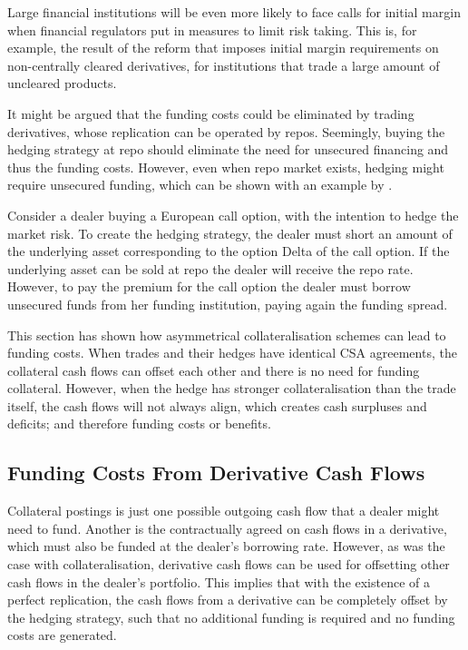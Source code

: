 \documentclass[main.tex]{subfiles}
\begin{document}
        Large financial institutions will be even more likely to face calls for initial margin
        when financial regulators put in measures to limit risk taking.
        This is, for example, the result of the reform \textcite{BCBC2020}
        that imposes initial margin requirements on non-centrally cleared derivatives, 
        for institutions that trade a large amount of uncleared products.

        It might be argued that the funding costs could be eliminated by trading derivatives,
        whose replication can be operated by repos. 
        Seemingly, buying the hedging strategy at repo should eliminate the need for unsecured financing
        and thus the funding costs. 
        However, even when repo market exists, hedging might require unsecured funding,
        which can be shown with an example by \textcite{Castagna2012FVA}.

        \begin{example}
        Consider a dealer buying a European call option, with the intention to hedge the market risk.
        To create the hedging strategy, the dealer must short an amount of the underlying asset corresponding to the option Delta of the call option.
        If the underlying asset can be sold at repo the dealer will receive the repo rate.
        However, to pay the premium for the call option the dealer must borrow unsecured funds from her funding institution,
        paying again the funding spread. 
        \end{example}

        This section has shown how asymmetrical collateralisation schemes
        can lead to funding costs. 
        When trades and their hedges have identical CSA agreements, 
        the collateral cash flows can offset each other and there is no need for funding collateral.
        However, when the hedge has stronger collateralisation than the trade itself,
        the cash flows will not always align, which creates cash surpluses and deficits;
        and therefore funding costs or benefits.
        
    \subsection{Funding Costs From Derivative Cash Flows}
        Collateral postings is just one possible outgoing cash flow that a dealer might need to fund.
        Another is the contractually agreed on cash flows in a derivative,
        which must also be funded at the dealer's borrowing rate.
        However, as was the case with collateralisation,
        derivative cash flows can be used for offsetting 
        other cash flows in the dealer's portfolio.
        This implies that with the existence of a perfect replication,
        the cash flows from a derivative can be completely offset by the hedging strategy,
        such that no additional funding is required and no funding costs are generated.
\end{document}
